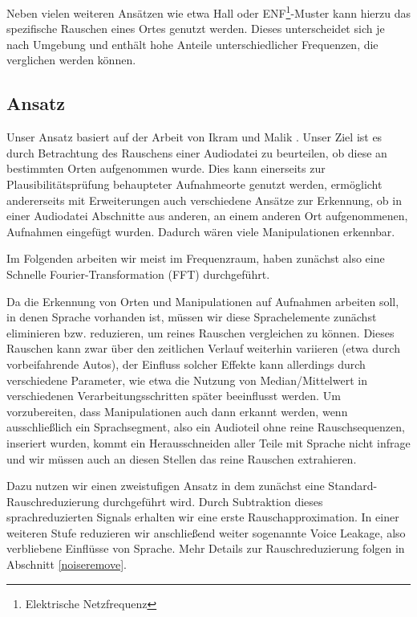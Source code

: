 \documentclass[
	fontsize=10.5pt,
	marginpar=false,
	ngerman,
	accentcolor=3d
	]{tudapub}
\begin{document}
Neben vielen weiteren Ansätzen wie etwa Hall oder ENF\footnote{Elektrische Netzfrequenz}-Muster kann hierzu das spezifische Rauschen eines Ortes genutzt werden. Dieses unterscheidet sich je nach Umgebung und enthält hohe Anteile unterschiedlicher Frequenzen, die verglichen werden können.

\subsection{Ansatz}

Unser Ansatz basiert auf der Arbeit von Ikram und Malik \cite{ikram_digital_2010}. Unser Ziel ist es durch Betrachtung des Rauschens einer Audiodatei zu beurteilen, ob diese an bestimmten Orten aufgenommen wurde. Dies kann einerseits zur Plausibilitätsprüfung behaupteter Aufnahmeorte genutzt werden, ermöglicht andererseits mit Erweiterungen auch verschiedene Ansätze zur Erkennung, ob in einer Audiodatei Abschnitte aus anderen, an einem anderen Ort aufgenommenen, Aufnahmen eingefügt wurden. Dadurch wären viele Manipulationen erkennbar.

Im Folgenden arbeiten wir meist im Frequenzraum, haben zunächst also eine Schnelle Fourier-Transformation (FFT) durchgeführt.

Da die Erkennung von Orten und Manipulationen auf Aufnahmen arbeiten soll, in denen Sprache vorhanden ist, müssen wir diese Sprachelemente zunächst eliminieren bzw. reduzieren, um reines Rauschen vergleichen zu können. Dieses Rauschen kann zwar über den zeitlichen Verlauf weiterhin variieren (etwa durch vorbeifahrende Autos), der Einfluss solcher Effekte kann allerdings durch verschiedene Parameter, wie etwa die Nutzung von Median/Mittelwert in verschiedenen Verarbeitungsschritten später beeinflusst werden. Um vorzubereiten, dass Manipulationen auch dann erkannt werden, wenn ausschließlich ein Sprachsegment, also ein Audioteil ohne reine Rauschsequenzen, inseriert wurden, kommt ein Herausschneiden aller Teile mit Sprache nicht infrage und wir müssen auch an diesen Stellen das reine Rauschen extrahieren.

Dazu nutzen wir einen zweistufigen Ansatz in dem zunächst eine Standard-Rauschreduzierung durchgeführt wird. Durch Subtraktion dieses sprachreduzierten Signals erhalten wir eine erste Rauschapproximation. In einer weiteren Stufe reduzieren wir anschließend weiter sogenannte Voice Leakage, also verbliebene Einflüsse von Sprache. Mehr Details zur Rauschreduzierung folgen in Abschnitt \ref{noiseremove}.
\end{document}
